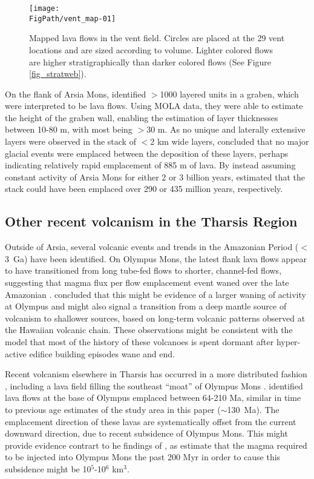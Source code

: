 \begin{figure}
\centering
\texttt{[image: \\FigPath/vent\_map-01]}
\caption{Mapped lava flows in the vent field. Circles are placed at the 29 vent locations and are sized according to volume. Lighter colored flows are higher stratigraphically than darker colored flows (See Figure \ref{fig_stratweb}).}
\label{fig_lavamap}
\end{figure}

On the flank of Arsia Mons, \citet{mouginis2008lava} identified $>$1000 layered units in a graben, which were interpreted to be lava flows. Using MOLA data, they were able to estimate the height of the graben wall, enabling the estimation of layer thicknesses between 10-80 m, with most being $>$30 m. As no unique and laterally extensive layers were observed in the stack of $<$2 km wide layers, \citet{mouginis2008lava} concluded that no major glacial events were emplaced between the deposition of these layers, perhaps indicating relatively rapid emplacement of 885 m of lava. By instead assuming constant activity of Arsia Mons for either 2 or 3 billion years, \citet{mouginis2008lava} estimated that the stack could have been emplaced over 290 or 435 million years, respectively. 

\subsection{Other recent volcanism in the Tharsis Region}

Outside of Arsia, several volcanic events and trends in the Amazonian Period ($<$3~Ga) have been identified. On Olympus Mons, the latest flank lava flows appear to have transitioned from long tube-fed flows to shorter, channel-fed flows, suggesting that magma flux per flow emplacement event waned over the late Amazonian \citep{bleacher2007olympus}. \citet{bleacher2007olympus} concluded that this might be evidence of a larger waning of activity at Olympus and might also signal a transition from a deep mantle source of volcanism to shallower sources, based on long-term volcanic patterns observed at the Hawaiian volcanic chain. These observations might be consistent with the \citet{wilson2001evidence} model that most of the history of these volcanoes is spent dormant after hyper-active edifice building episodes wane and end.

Recent volcanism elsewhere in Tharsis has occurred in a more distributed fashion \citep{hauber2011very}, including a lava field filling the southeast ``moat'' of Olympus Mons \citep{chadwick2015late}. \citet{chadwick2015late} identified lava flows at the base of Olympus emplaced between 64-210 Ma, similar in time to previous age estimates of the study area in this paper ($\sim$130~Ma). The emplacement direction of these lavas are systematically offset from the current downward direction, due to recent subsidence of Olympus Mons. This might provide evidence contrart to he findings of \citet{bleacher2007olympus}, as \citet{chadwick2015late} estimate that the magma required to be injected into Olympus Mons the past 200 Myr in order to cause this subsidence might be 10$^5$-10$^6$ km$^3$.

